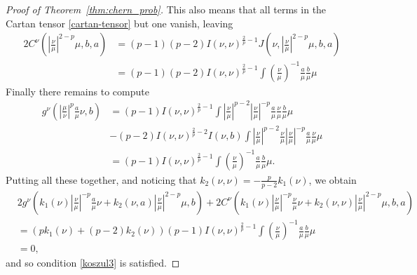 \documentclass[11pt]{amsart}
\theoremstyle{definition}
\newcommand{\Abs}[1]{\left|#1\right|}
\begin{document}
\begin{proof}[Proof of Theorem~\ref{thm:chern_prob}]
This also means that all terms in the Cartan tensor \eqref{cartan-tensor} but one vanish, leaving
\begin{align*}
2C^\nu\left(\Abs{\frac{\nu}{\mu}}^{2-p}\mu,b,a\right)&=(p-1)(p-2)I(\nu,\nu)^{\frac{2}{p}-1}J\left(\nu,\Abs{\frac{\nu}{\mu}}^{2-p}\mu,b,a\right)\\
&=(p-1)(p-2)I(\nu,\nu)^{\frac{2}{p}-1}\int \left(\frac{\nu}{\mu}\right)^{-1}\frac{a}{\mu}\frac{b}{\mu}\mu
\end{align*}
Finally there remains to compute
\begin{align*}
g^\nu\left(\Abs{\frac{\mu}{\nu}}^p\frac{a}{\mu}\nu, b\right)&=(p-1)I(\nu,\nu)^{\frac{2}{p}-1}\int \Abs{\frac{\nu}{\mu}}^{p-2}\Abs{\frac{\nu}{\mu}}^{-p}\frac{a}{\mu}\frac{\nu}{\mu}\frac{b}{\mu}\mu\\
&-(p-2)I(\nu,\nu)^{\frac{2}{p}-2}I(\nu,b)\int \Abs{\frac{\nu}{\mu}}^{p-2}\frac{\nu}{\mu}\Abs{\frac{\nu}{\mu}}^{-p}\frac{a}{\mu}\frac{\nu}{\mu}\mu\\
&=(p-1)I(\nu,\nu)^{\frac{2}{p}-1}\int \left(\frac{\nu}{\mu}\right)^{-1}\frac{a}{\mu}\frac{b}{\mu}\mu.
\end{align*}
Putting all these together, and noticing that $k_2(\nu,\nu)=-\frac{p}{p-2}k_1(\nu)$, we obtain 
\begin{align*}
&2g^\nu\left(k_1(\nu)\Abs{\frac{\nu}{\mu}}^{-p}\frac{a}{\mu}\nu+ k_2(\nu,a)\Abs{\frac{\nu}{\mu}}^{2-p}\mu,b\right)  + 2C^\nu\left(k_1(\nu)\Abs{\frac{\nu}{\mu}}^{-p}\frac{\nu}{\mu}\nu +k_2(\nu,\nu)\Abs{\frac{\nu}{\mu}}^{2-p}\mu , b, a\right)\\
&=\left(pk_1(\nu)+(p-2)k_2(\nu)\right)(p-1)I(\nu,\nu)^{\frac{2}{p}-1}\int \left(\frac{\nu}{\mu}\right)^{-1}\frac{a}{\mu}\frac{b}{\mu}\mu\\
&=0,
\end{align*}
and so condition \eqref{koszul3} is satisfied. 
\end{proof}
\end{document}
